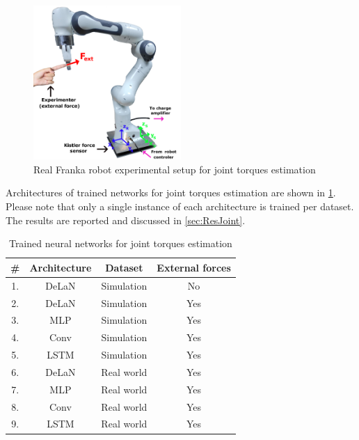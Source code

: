 \begin{figure}
    \centering
    \includegraphics[width=0.5\textwidth]{slike/franka_torque.png}
    \caption{Real Franka robot experimental setup for joint torques estimation}
    \label{fig:FrankaTorqueSetup}
\end{figure}

Architectures of trained networks for joint torques estimation are shown in \cref{tab:NetworksFrankaTorque}. Please note that only a single instance of each architecture is trained per dataset. The results are reported and discussed in \cref{sec:ResJoint}.

\begin{table}
    \centering
    \caption{Trained neural networks for joint torques estimation}
    \label{tab:NetworksFrankaTorque}
    \begin{tabular}{cccc}
        \toprule
        \textbf{\#} & \textbf{Architecture} & \textbf{Dataset} & \textbf{External forces} \\
        \midrule
        1. & DeLaN & Simulation & No \\ %
        2. & DeLaN & Simulation & Yes \\ %
        3. & MLP & Simulation & Yes \\ %
        4. & Conv & Simulation & Yes\\ %
        5. & LSTM & Simulation & Yes \\ %
        \midrule
        6. & DeLaN & Real world & Yes \\ %
        7. & MLP & Real world & Yes\\%
        8. & Conv & Real world & Yes\\ %
        9. & LSTM & Real world & Yes\\ %
        \bottomrule
    \end{tabular}
\end{table}

